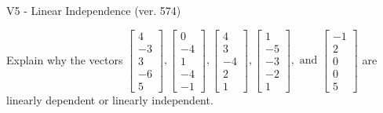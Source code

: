 \begin{exercise}
  \begin{exerciseTitle}V5 - Linear Independence (ver. 574)\end{exerciseTitle}
  \begin{exerciseStatement}
    Explain why the vectors \(\left[\begin{array}{r}
4 \\
-3 \\
3 \\
-6 \\
5
\end{array}\right] , \left[\begin{array}{r}
0 \\
-4 \\
1 \\
-4 \\
-1
\end{array}\right] , \left[\begin{array}{r}
4 \\
3 \\
-4 \\
2 \\
1
\end{array}\right] , \left[\begin{array}{r}
1 \\
-5 \\
-3 \\
-2 \\
1
\end{array}\right] , \text{ and } \left[\begin{array}{r}
-1 \\
2 \\
0 \\
0 \\
5
\end{array}\right]\) are linearly dependent or linearly independent.	



\end{exerciseStatement}
\end{exercise}
